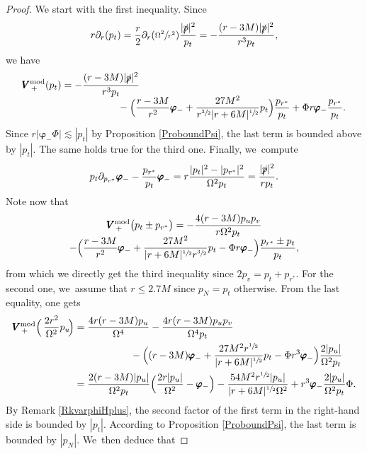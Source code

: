 \documentclass[10pt]{amsart}
\theoremstyle{plain}
\theoremstyle{definition}
\begin{document}
\begin{proof}
We start with the first inequality. Since
\begin{equation*}
r\partial_r (p_t) = \frac{r}{2}\partial_r(\sfrac{\Omega^2}{r^2}) \frac{|\slashed{p}|^2}{p_t} = - \frac{(r-3M)|\slashed{p}|^2}{r^3 p_t},
\end{equation*}
we have
\begin{align}\label{eq:Vpluspt}
\pmb{V}_{\, +}^{ \mathrm{mod}} (p_t)&= -\frac{(r-3M)|\slashed{p}|^2}{r^3 p_t}\\[-5pt]
&\hspace*{2cm}-\Bigl(\frac{r-3M}{r^2} \pmb{\varphi}_- +\frac{27M^2 }{r^{\sfrac{3}{2}}|r+6M|^{\sfrac{1}{2}}}p_t \Bigr) \frac{p_{r^*}}{p_t}+\Phi r \pmb{\varphi}_- \frac{p_{r^*}}{p_t}.\notag
\end{align}
Since $r |\pmb{\varphi}_- \Phi| \lesssim |p_t|$ by Proposition \ref{ProboundPsi}, the last term is bounded above by $|p_t|$. The same holds true for the third one. Finally, we~compute
\[
p_t \partial_{p_{r^*}} \pmb{\varphi}_- - \frac{p_{r^*}}{p_t} \pmb{\varphi}_- =r\frac{|p_t|^2-|p_{r^*}|^2}{\Omega^2 p_t}=\frac{|\slashed{p}|^2}{rp_t}.
\]
Note now that
\begin{multline*}
\pmb{V}_{\, +}^{ \mathrm{mod}} \bigl(p_t \pm p_{r^*} \bigr)= -\frac{4(r-3M)p_up_v}{r \Omega^2 p_t}\\[-5pt]
-\Bigl(\frac{r-3M}{r^2} \pmb{\varphi}_- +\frac{27M^2 }{|r+6M|^{\sfrac{1}{2}}r^{\sfrac{3}{2}}}p_t-\Phi r \pmb{\varphi}_- \Bigr) \frac{p_{r^*}\pm p_t}{p_t},
\end{multline*}
from which we directly get the third inequality since $2p_v=p_t+p_{r^*}$. For the second one, we~assume that $r \leq 2.7M$ since $p_N=p_t$ otherwise. From the last equality, one gets
\begin{align}
\pmb{V}_{\, +}^{ \mathrm{mod}} \Bigl(\, \frac{2r^2 }{\Omega^2}p_u \! \Bigr) &= \frac{4r(r-3M)p_u}{\Omega^4} -\frac{4r(r-3M)p_up_v}{ \Omega^4 p_t}\notag \\
&\label{eq:VpluspN} \hspace*{2cm} -\Bigl((r-3M) \pmb{\varphi}_- +\frac{27M^2r^{\sfrac{1}{2}} }{|r+6M|^{\sfrac{1}{2}}}p_t-\Phi r^3 \pmb{\varphi}_- \Bigr) \frac{2|p_u|}{\Omega^2p_t} \\
& = \frac{2(r-3M)|p_u|}{\Omega^2p_t} \Bigl(\frac{2r|p_u|}{\Omega^2}- \pmb{\varphi}_- \Bigr)-\frac{54M^2r^{\sfrac{1}{2}}|p_u| }{|r+6M|^{\sfrac{1}{2}} \Omega^2 }+ r^3 \pmb{\varphi}_-\frac{2|p_u|}{\Omega^2p_t} \Phi. \notag
\end{align}
By Remark \ref{RkvarphiHplus}, the second factor of the first term in the right-hand side is bounded by $|p_t|$. According to Proposition \ref{ProboundPsi}, the last term is bounded by $|p_N|$. We~then deduce that

\end{proof}
\end{document}
